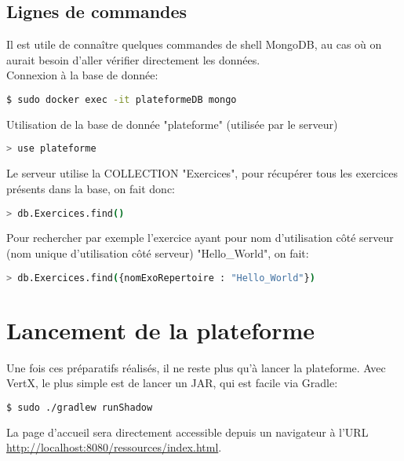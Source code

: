 \documentclass[a4paper]{article}
\begin{document}
\subsection{Lignes de commandes}
Il est utile de connaître quelques commandes de shell MongoDB, au cas où on aurait besoin d'aller vérifier directement les données.\\
Connexion à la base de donnée:

\begin{lstlisting}[language=bash]
 $ sudo docker exec -it plateformeDB mongo
\end{lstlisting}
Utilisation de la base de donnée "plateforme" (utilisée par le serveur)
\begin{lstlisting}[language=bash]
  > use plateforme
\end{lstlisting}
Le serveur utilise la COLLECTION "Exercices", pour récupérer tous les exercices présents dans la base, on fait donc:
\begin{lstlisting}[language=bash]
  > db.Exercices.find()
\end{lstlisting}
Pour rechercher par exemple l'exercice ayant pour nom d'utilisation côté serveur (nom unique d'utilisation côté serveur) "Hello\_World", on fait:
\begin{lstlisting}[language=bash]
  > db.Exercices.find({nomExoRepertoire : "Hello_World"})
\end{lstlisting}

\section{Lancement de la plateforme}
Une fois ces préparatifs réalisés, il ne reste plus qu'à lancer la plateforme. Avec VertX, le plus simple est de lancer un JAR, qui est facile via Gradle:
\begin{lstlisting}[language=bash]
  $ sudo ./gradlew runShadow
\end{lstlisting}
La page d'accueil sera directement accessible depuis un navigateur à l'URL \url{http://localhost:8080/ressources/index.html}.
\end{document}
